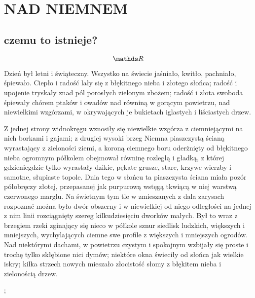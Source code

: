 \documentclass{article}
\begin{document}
\section{NAD NIEMNEM}
\subsection{czemu to istnieje?}
$$\R$$

Dzień {\color{def}był letni i świąteczny}. Wszystko na świecie jaśniało, kwitło, pachniało, śpiewało. Ciepło i radość lały się z błękitnego nieba i złotego słońca; radość i upojenie tryskały znad pól porosłych zielonym zbożem; radość i złota swoboda śpiewały chórem ptaków i owadów nad równiną w gorącym powietrzu, nad {\color{acc}niewielkimi wzgórzami, w okrywających} je bukietach iglastych i liściastych drzew.\bigskip

\bigskip

Z jednej strony widnokręgu wznosiły się niewielkie wzgórza z ciemniejącymi na nich borkami i gajami; z drugiej wysoki brzeg Niemna piaszczystą ścianą wyrastający z zieloności ziemi, a koroną ciemnego boru oderżnięty od błękitnego nieba ogromnym półkolem obejmował równinę rozległą i gładką, z której gdzieniegdzie tylko wyrastały dzikie, pękate grusze, stare, krzywe wierzby i samotne, słupiaste topole. Dnia tego w słońcu ta piaszczysta ściana miała pozór półobręczy złotej, przepasanej jak purpurową wstęgą tkwiącą w niej warstwą czerwonego marglu. Na świetnym tym tle w zmieszanych z dala zarysach rozpoznać można było dwór obszerny i w niewielkiej od niego odległości na jednej z nim linii rozciągnięty szereg kilkudziesięciu dworków małych. Był to wraz z brzegiem rzeki zginający się nieco w półkole sznur siedlisk ludzkich, większych i mniejszych, wychylających ciemne swe profile z większych i mniejszych ogrodów. Nad niektórymi dachami, w powietrzu czystym i spokojnym wzbijały się proste i trochę tylko skłębione nici dymów; niektóre okna świeciły od słońca jak wielkie iskry; kilka strzech nowych mieszało złocistość słomy z błękitem nieba i zielonością drzew.

\pgraf
        ;
    \kaxis
\kgraf
\end{document}
